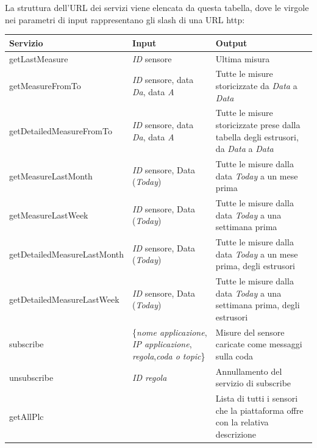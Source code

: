 \clearpage
La struttura dell’URL dei servizi viene elencata da questa tabella, dove le virgole nei parametri di input rappresentano gli slash di una URL http:
\begin{center}
	\begin{tabular}{ | l | p{5.06cm} | p{5.06cm} |}
		\hline
		\textbf{Servizio} & \textbf{Input} & \textbf{Output} \\ \hline
		getLastMeasure & \textit{ID} sensore & Ultima misura   \\ \hline
		getMeasureFromTo & \textit{ID} sensore, data \textit{Da}, data \textit{A} & Tutte le misure storicizzate da \textit{Data} a \textit{Data} \\ \hline
		getDetailedMeasureFromTo & \textit{ID} sensore, data \textit{Da}, data \textit{A} & Tutte le misure storicizzate prese dalla tabella degli estrusori, da \textit{Data} a \textit{Data}  \\ \hline
		getMeasureLastMonth & \textit{ID} sensore, Data (\textit{Today}) & Tutte le misure dalla data \textit{Today} a un mese prima \\ \hline
		getMeasureLastWeek & \textit{ID} sensore, Data (\textit{Today}) & Tutte le misure dalla data \textit{Today} a una settimana prima \\ \hline
		getDetailedMeasureLastMonth & \textit{ID} sensore, Data (\textit{Today}) & Tutte le misure dalla data \textit{Today} a un mese prima, degli estrusori \\ \hline
		getDetailedMeasureLastWeek & \textit{ID} sensore, Data (\textit{Today}) & Tutte le misure dalla data \textit{Today} a una settimana prima, degli estrusori \\ \hline
		subscribe & \{\textit{nome applicazione}, \textit{IP applicazione}, \textit{regola},\textit{coda o topic}\} & Misure del sensore caricate come messaggi sulla coda \\ \hline
		unsubscribe & \textit{ID regola} & Annullamento del servizio di subscribe \\ \hline
		getAllPlc & & Lista di tutti i sensori che la piattaforma offre con la relativa descrizione \\ \hline
	\end{tabular}
\end{center}

